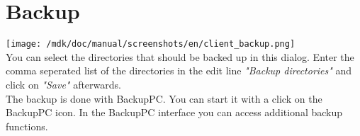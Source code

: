 \section{Backup}
\texttt{[image: /mdk/doc/manual/screenshots/en/client\_backup.png]} \\
You can select the directories that should be backed up in this dialog. Enter the comma seperated list of the directories in the edit line \textit{"Backup directories"} and click on \textit{"Save"} afterwards.\\
The backup is done with BackupPC. You can start it with a click on the BackupPC icon. In the BackupPC interface you can access additional backup functions.\\

